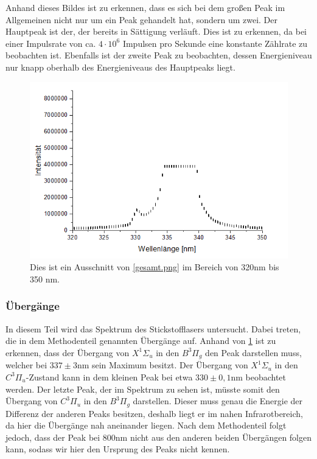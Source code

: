 \documentclass[
	a4paper,
	12pt,
	pagesize,
	ngerman
]{scrartcl}
\begin{document}
Anhand dieses Bildes ist zu erkennen, dass es sich bei dem großen Peak im Allgemeinen nicht nur um ein Peak gehandelt hat, sondern um zwei. Der Hauptpeak ist der, der bereits in Sättigung verläuft. Dies ist zu erkennen, da bei einer Impulsrate von ca. $4 \cdot 10^6$ Impulsen pro Sekunde eine konstante Zählrate zu beobachten ist. Ebenfalls ist der zweite Peak zu beobachten, dessen Energieniveau nur knapp oberhalb des Energieniveaus des Hauptpeaks liegt.
\begin{figure}[h!]
	\centering
	\includegraphics[scale = 1.5]{fitbilfuns.png}
	\caption{Dies ist ein Ausschnitt von \cref{gesamt.png} im Bereich von 320nm bis 350 nm.}
	\label{naherpeak}
\end{figure}

\subsubsection{Übergänge}
In diesem Teil wird das Spektrum des Stickstofflasers untersucht. Dabei treten, die in dem Methodenteil genannten Übergänge auf. Anhand von \cref{naherpeak} ist zu erkennen, dass der Übergang von $X^1\Sigma_u$ in den $B^3\Pi_g$ den Peak darstellen muss, welcher bei $337 \pm 3$nm sein Maximum besitzt. Der Übergang von 
$X^1\Sigma_u$ in den $C^3\Pi_u$-Zustand kann in dem kleinen Peak bei etwa $330 \pm 0,1$nm beobachtet werden. Der letzte Peak, der im Spektrum zu sehen ist, müsste somit den Übergang von $C^3\Pi_u$ in den $B^3\Pi_g$ darstellen. Dieser muss genau die Energie der Differenz der anderen Peaks besitzen, deshalb liegt er im nahen Infrarotbereich, da hier die Übergänge nah aneinander liegen. Nach dem Methodenteil folgt jedoch, dass der Peak bei $800$nm nicht aus den anderen beiden Übergängen folgen kann, sodass wir hier den Ursprung des Peaks nicht kennen. 
\end{document}
